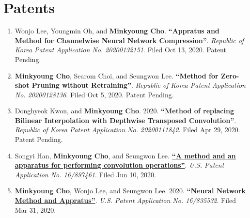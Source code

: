 \documentclass[letterpaper,oneside,11pt]{article}
\begin{document}
\section{Patents}
\begin{enumerate}[leftmargin=*, itemsep=0em]
  \item \small Wonjo Lee, Youngmin Oh, and \textbf{Minkyoung Cho}. \textbf{``Appratus and Method for Channelwise Neural Network Compression''}. \textit{Republic of Korea Patent Application No. 20200132151}. Filed Oct 13, 2020. Patent Pending.
  \item \small \textbf{Minkyoung Cho}, Searom Choi, and Seungwon Lee. \textbf{``Method for Zero-shot Pruning without Retraining''}. \textit{Republic of Korea Patent Application No. 20200128136}. Filed Oct 5, 2020. Patent Pending.
  \item \small Donghyeok Kwon, and \textbf{Minkyoung Cho}. 2020. \textbf{``Method of replacing Bilinear Interpolation with Depthwise Transposed Convolution''}. \textit{Republic of Korea Patent Application No. 20200111842}. Filed Apr 29, 2020. Patent Pending.
  \item \small Songyi Han, \textbf{Minkyoung Cho}, and Seungwon Lee. \textbf{\href{https://patents.google.com/patent/KR20210082970A/en?inventor=minkyoung+cho&assignee=samsung&oq=minkyoung+cho+samsung}{``A method and an apparatus for performing convolution operations''}}. \textit{U.S. Patent Application No. 16/897461}. Filed Jun 10, 2020.
  \item \small \textbf{Minkyoung Cho}, Wonjo Lee, and Seungwon Lee. 2020. \textbf{\href{https://patents.google.com/patent/US20210081798A1/en?inventor=minkyoung+cho&assignee=samsung&oq=minkyoung+cho+samsung}{``Neural Network Method and Appratus''}}. \textit{U.S. Patent Application No. 16/835532}. Filed Mar 31, 2020.
\end{enumerate}

\end{document}
